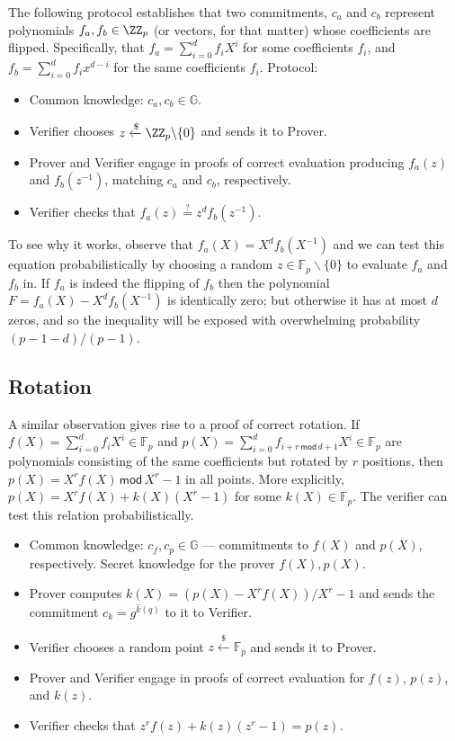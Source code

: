 \documentclass{article}
\theoremstyle{definition}
\begin{document}
The following protocol establishes that two commitments, $c_a$ and $c_b$ represent polynomials $f_a, f_b \in \ZZ_p$ (or vectors, for that matter) whose coefficients are flipped. Specifically, that $f_a = \sum_{i=0}^{d}f_i X^i$ for some coefficients $f_i$, and $f_b = \sum_{i=0}^df_ix^{d-i}$ for the same coefficients $f_i$.
Protocol:
\begin{itemize}
    \item Common knowledge: $c_a, c_b \in \mathbb{G}$.
    \item Verifier chooses $z \xleftarrow{\$} \ZZ_p \backslash \{0\}$ and sends it to Prover.
    \item Prover and Verifier engage in proofs of correct evaluation producing $f_a(z)$ and $f_b(z^{-1})$, matching $c_a$ and $c_b$, respectively.
    \item Verifier checks that $f_a(z) \stackrel{?}{=} z^d f_b(z^{-1})$.
\end{itemize}

To see why it works, observe that $f_a(X) = X^df_b(X^{-1})$ and we can test this equation probabilistically by choosing a random $z \in \mathbb{F}_p \backslash \{0\}$ to evaluate $f_a$ and $f_b$ in. If $f_a$ is indeed the flipping of $f_b$ then the polynomial $F = f_a(X) - X^df_b(X^{-1})$ is identically zero; but otherwise it has at most $d$ zeros, and so the inequality will be exposed with overwhelming probability $(p-1-d)/(p-1)$.

\subsection{Rotation}

A similar observation gives rise to a proof of correct rotation. If $f(X) = \sum_{i=0}^d f_i X^i \in \mathbb{F}_p$ and $p(X) = \sum_{i=0}^d f_{i+r \, \mathsf{mod} \, d+1} X^i \in \mathbb{F}_p$ are polynomials consisting of the same coefficients but rotated by $r$ positions, then $p(X) = X^r f(X) \, \mathsf{mod} \, X^r - 1$ in all points. More explicitly, $p(X) = X^r f(X) + k(X) (X^r - 1)$ for some $k(X) \in \mathbb{F}_p$. The verifier can test this relation probabilistically.

\begin{itemize}
    \item Common knowledge: $c_f, c_p \in \mathbb{G}$ --- commitments to $f(X)$ and $p(X)$, respectively. Secret knowledge for the prover $f(X), p(X)$.
    \item Prover computes $k(X) = (p(X) - X^r f(X)) / X^r - 1$ and sends the commitment $c_k = g^{\hat{k}(q)}$ to it to Verifier.
    \item Verifier chooses a random point $z \xleftarrow{\$} \mathbb{F}_p$ and sends it to Prover.
    \item Prover and Verifier engage in proofs of correct evaluation for $f(z)$, $p(z)$, and $k(z)$.
    \item Verifier checks that $z^r f(z) + k(z) (z^r-1) = p(z)$.
\end{itemize}
\end{document}
